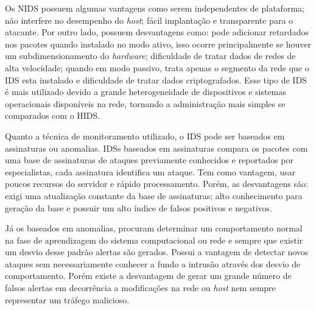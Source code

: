 \documentclass[
	12pt,				
	openright,		
	twoside,	
	a4paper,
	english,	
	brazil	
	]{abntex2}
\begin{document}
Os NIDS possuem algumas vantagens como serem independentes de plataforma; não interfere no desempenho do \textit{host}; fácil implantação e transparente para o atacante. Por outro lado, possuem desvantagens como: pode adicionar retardados nos pacotes quando instalado no modo ativo, isso ocorre principalmente se houver um subdimensionamento do \textit{hardware}; dificuldade de tratar dados de redes de alta velocidade; quando em modo passivo, trata apenas o segmento da rede que o IDS esta instalado e dificuldade de tratar dados criptografados. Esse tipo de IDS é mais utilizado devido a grande heterogeneidade de dispositivos e sistemas operacionais disponíveis na rede, tornando a administração mais simples se comparados com o HIDS.

Quanto a técnica de monitoramento utilizado, o IDS pode ser baseados em assinaturas ou anomalias. IDSs baseados em assinaturas compara os pacotes com uma base de assinaturas de ataques previamente conhecidos e reportados por especialistas, cada assinatura identifica um ataque. Tem como vantagem, usar poucos recursos do servidor e rápido processamento. Porém, as desvantagens são: exigi uma atualização constante da base de assinaturas; alto conhecimento para geração da base e possuir um alto índice de falsos positivos e negativos.

Já os baseados em anomalias, procuram determinar um comportamento normal na fase de aprendizagem do sistema computacional ou rede e sempre que existir um desvio desse padrão alertas são gerados. Possui a vantagem de detectar novos ataques sem necessariamente conhecer a fundo a intrusão através dos desvio de comportamento. Porém existe a desvantagem de gerar um grande número de falsos alertas em decorrência a modificações na rede ou \textit{host} nem sempre representar um tráfego malicioso. 
\end{document}
